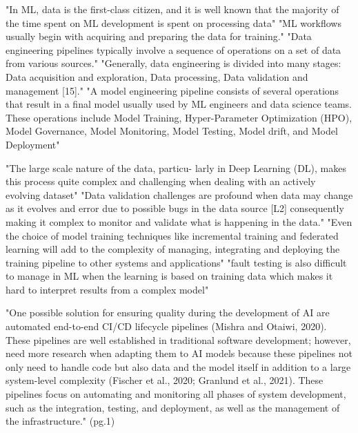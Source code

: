 "In ML, data is the first-class citizen, and it is well known that the majority
of the time spent on ML development is spent on processing data"
"ML workflows usually begin with acquiring and preparing the data for training."
"Data engineering pipelines typically involve a sequence of operations on a set
of data from various sources."
"Generally, data engineering is divided into many stages: Data acquisition and
exploration, Data processing, Data validation and management [15]."
"A model engineering pipeline consists of several operations that result in a
final model usually used by ML engineers and data science teams. These
operations include Model Training, Hyper-Parameter Optimization (HPO), Model
Governance, Model Monitoring, Model Testing, Model drift, and Model Deployment"

"The large scale nature of the data, particu- larly in Deep Learning (DL),
makes this process quite complex and challenging when dealing with an actively
evolving dataset"
"Data validation challenges are profound when data may change as it evolves and
error due to possible bugs in the data source [L2] consequently making it
complex to monitor and validate what is happening in the data."
"Even the choice of model training techniques like incremental training and
federated learning will add to the complexity of managing, integrating and
deploying the training pipeline to other systems and applications"
"fault testing is also difficult to manage in ML when the learning is based on
training data which makes it hard to interpret results from a complex model"


\parencite{Steidl2023ThePractice}


"One possible solution for ensuring quality during the development of AI are
automated end-to-end CI/CD lifecycle pipelines (Mishra and Otaiwi, 2020). These
pipelines are well established in traditional software development; however,
need more research when adapting them to AI models because these pipelines not
only need to handle code but also data and the model itself in addition to a
large system-level complexity (Fischer et al., 2020; Granlund et al., 2021).
These pipelines focus on automating and monitoring all phases of system
development, such as the integration, testing, and deployment, as well as the
management of the infrastructure." (pg.1)

